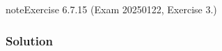 \documentclass[letterpaper,10pt,english]{jupyterBook}
\begin{document}
\begin{sphinxadmonition}{note}{Exercise 6.7.15 (Exam 2025\sphinxhyphen{}01\sphinxhyphen{}22, Exercise 3.)}



\begin{figure}[htbp]
\centering

\noindent{}
\end{figure}
\subsubsection*{Solution}




\begin{savenotes}\sphinxattablestart
\centering
\begin{tabulary}{\linewidth}[t]{|T|T|T|}
\hline


\end{tabulary}
\end{savenotes}
\end{sphinxadmonition}
\end{document}
